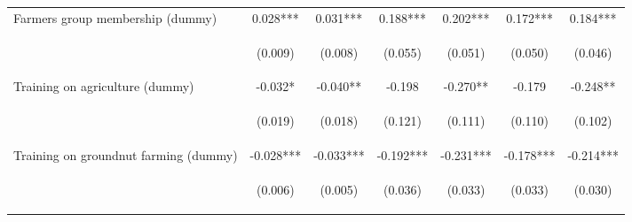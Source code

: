 \begin{center}
\begin{tabular}{lcccccc}
Farmers group membership (dummy) & 0.028*** & 0.031*** & 0.188*** & 0.202*** & 0.172*** & 0.184*** \\
\vspace{4pt} & \begin{footnotesize}(0.009)\end{footnotesize} & \begin{footnotesize}(0.008)\end{footnotesize} & \begin{footnotesize}(0.055)\end{footnotesize} & \begin{footnotesize}(0.051)\end{footnotesize} & \begin{footnotesize}(0.050)\end{footnotesize} & \begin{footnotesize}(0.046)\end{footnotesize} \\
Training on agriculture (dummy) & -0.032* & -0.040** & -0.198 & -0.270** & -0.179 & -0.248** \\
\vspace{4pt} & \begin{footnotesize}(0.019)\end{footnotesize} & \begin{footnotesize}(0.018)\end{footnotesize} & \begin{footnotesize}(0.121)\end{footnotesize} & \begin{footnotesize}(0.111)\end{footnotesize} & \begin{footnotesize}(0.110)\end{footnotesize} & \begin{footnotesize}(0.102)\end{footnotesize} \\
Training on groundnut farming (dummy) & -0.028*** & -0.033*** & -0.192*** & -0.231*** & -0.178*** & -0.214*** \\
\vspace{4pt} & \begin{footnotesize}(0.006)\end{footnotesize} & \begin{footnotesize}(0.005)\end{footnotesize} & \begin{footnotesize}(0.036)\end{footnotesize} & \begin{footnotesize}(0.033)\end{footnotesize} & \begin{footnotesize}(0.033)\end{footnotesize} & \begin{footnotesize}(0.030)\end{footnotesize} \\

\end{tabular}
\end{center}
